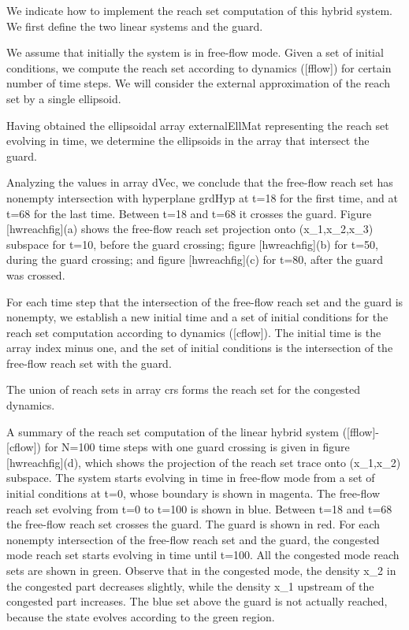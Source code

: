 \documentclass[letterpaper,10pt,english]{sphinxmanual}
\begin{document}
We indicate how to implement the reach set computation of this hybrid
system. We first define the two linear systems and the guard.

We assume that initially the system is in free-flow mode. Given a set of
initial conditions, we compute the reach set according to dynamics
({[}fflow{]}) for certain number of time steps. We will consider the
external approximation of the reach set by a single ellipsoid.

Having obtained the ellipsoidal array externalEllMat representing the
reach set evolving in time, we determine the ellipsoids in the array
that intersect the guard.

Analyzing the values in array dVec, we conclude that the free-flow reach
set has nonempty intersection with hyperplane grdHyp at t=18 for
the first time, and at t=68 for the last time. Between
t=18 and t=68 it crosses the guard. Figure
{[}hwreachfig{]}(a) shows the free-flow reach set projection onto
(x_1,x_2,x_3) subspace for t=10, before the guard
crossing; figure {[}hwreachfig{]}(b) for t=50, during the guard
crossing; and figure {[}hwreachfig{]}(c) for t=80, after the guard
was crossed.

For each time step that the intersection of the free-flow reach set and
the guard is nonempty, we establish a new initial time and a set of
initial conditions for the reach set computation according to dynamics
({[}cflow{]}). The initial time is the array index minus one, and the set of
initial conditions is the intersection of the free-flow reach set with
the guard.

The union of reach sets in array crs forms the reach set for the
congested dynamics.

A summary of the reach set computation of the linear hybrid system
({[}fflow{]}-{[}cflow{]}) for N=100 time steps with one guard crossing
is given in figure {[}hwreachfig{]}(d), which shows the projection of the
reach set trace onto (x_1,x_2) subspace. The system starts
evolving in time in free-flow mode from a set of initial conditions at
t=0, whose boundary is shown in magenta. The free-flow reach set
evolving from t=0 to t=100 is shown in blue. Between
t=18 and t=68 the free-flow reach set crosses the guard.
The guard is shown in red. For each nonempty intersection of the
free-flow reach set and the guard, the congested mode reach set starts
evolving in time until t=100. All the congested mode reach sets
are shown in green. Observe that in the congested mode, the density
x_2 in the congested part decreases slightly, while the density
x_1 upstream of the congested part increases. The blue set above
the guard is not actually reached, because the state evolves according
to the green region.
\end{document}
